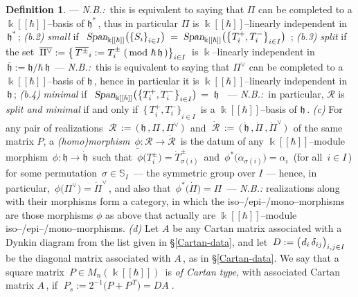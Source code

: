 \documentclass[12pt,reqno,twoside,a4paper]{amsart}
\numberwithin{equation}{section}
\theoremstyle{definition}
\newtheorem{definition}[lema]{Definition}
\newtheorem{free text}[lema]{}
\theoremstyle{remark}
\newcommand{\R}{{\mathcal R}}
\def \kh{{\Bbbk[[\hbar]]}}
\def \lieh{\mathfrak{h}}
\theoremstyle{plain}
\begin{document}
\begin{definition}
   ---  \textsl{N.B.:}\, this is equivalent to saying that  $ \Pi $ can be completed to a  $ \kh $--basis  of  $ \lieh^* \, $,
   thus in particular  $ \Pi $  is  $ \kh $--linearly  independent in  $ \, \lieh^* \, $;
%
 \vskip3pt
%
   \quad \textit{(b.2)} \;  \textsl{small\/}  if
   $ \,\; \textsl{Span}_\kh\big( {\{ S_i \}}_{i \in I} \big) \; = \; \textsl{Span}_\kh\big( {\big\{ T_i^+ , T_i^- \big\}}_{i \in I} \big) \;\, $;
%
 \vskip3pt
%
   \quad \textit{(b.3)} \;  \textsl{split\/}  if the set
   $ \, \overline{\Pi^\vee} := {\big\{\, \overline{T^\pm}_i := T^\pm_i \; (\text{\,mod\ } \hbar\,\lieh \,) \big\}}_{i \in I} \, $
   is  $ \Bbbk $--linearly  independent in  $ \, \overline{\lieh} := \lieh \Big/ \hbar\,\lieh \, $   ---   \textsl{N.B.:}\,
   this is equivalent to saying that  $ \Pi^\vee $  can be completed to a  $ \kh $--basis  of  $ \lieh \, $,
   hence in particular it is  $ \kh $--linearly  independent in  $ \, \lieh \, $;
%
 \vskip3pt
%
   \quad \textit{(b.4)} \;  \textsl{minimal\/}  if
   $ \,\; \textsl{Span}_\kh\big( {\big\{ T_i^+ , T_i^- \big\}}_{i \in I} \big) \, = \; \lieh \;\, $
   ---   \textsl{N.B.:}\,  in particular,  $ \R $  is  \textsl{split\/  {\rm and}  minimal\/}  if and only if
   $ \, {\big\{\, T_i^+ , T_i^- \big\}}_{i \in I} \, $  is a  $ \kh $--basis  of  $ \lieh \, $.
%
 \vskip5pt
%
   \textit{(c)}\;  For any pair of realizations  $ \; \R \, := \, \big(\, \lieh \, , \Pi \, , \Pi^\vee \,\big) \; $  and  $ \; \dot{\R} \, := \, \big(\, \dot{\lieh} \, , \dot{\Pi} \, , {\dot{\Pi}}^\vee \,\big) \; $  of the same matrix  $ P $,
   a \textsl{(homo)morphism\/}  $ \, \underline{\phi} : \R \longrightarrow \dot{\R} \, $  is the datum of any  $ \kh $--module morphism  $ \, \phi : \lieh \longrightarrow \dot{\lieh} \, $  such that  $ \, \phi\big(T_i^\pm\big) = {\dot{T}}_{\sigma(i)}^\pm \, $  and  $ \, \phi^*\big(\dot{\alpha}_{\sigma(i)}\big) = \alpha_i \, $  (for all  $ \, i \in I \, $)  for some permutation  $ \, \sigma \in \mathbb{S}_{I} \, $   --- the symmetric group over  $ I $   ---   hence, in particular,  $ \, \phi\big(\Pi^\vee\big) = {\dot{\Pi}}^\vee \, $,  and also that  $ \, \phi^*\big(\dot{\Pi}\big) = \Pi \, $
   ---  \textsl{N.B.:}  realizations along with their morphisms form a category,
   in which the iso--/epi--/mono--morphisms are those morphisms  $ \phi $  as above that actually are  $ \kh $--module  iso--/epi--/mono--morphisms.
%
 \vskip5pt
%
   \textit{(d)}\;  Let  $ A $  be any Cartan matrix associated with a Dynkin diagram from the list given in  \S \ref{Cartan-data}, and let  $ \, D := {\big(\hskip0,7pt d_i \, \delta_{ij} \big)}_{i, j \in I} \, $  be the diagonal matrix associated with  $ A \, $,  as in  \S \ref{Cartan-data}.  We say that a square matrix  $ \, P \in M_n(\kh) \, $  is  \textsl{of Cartan type},  with associated Cartan matrix  $ A \, $,  if  $ \; P_s := 2^{-1} \big( P + P^{\,\scriptscriptstyle T} \big) = DA \; $.

\end{definition}
\end{document}
